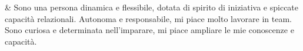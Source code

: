 & Sono una persona dinamica e f\mbox{}lessibile, dotata di spirito di iniziativa e spiccate capacit\`a relazionali. Autonoma e responsabile, mi piace molto lavorare in team. Sono curiosa e determinata nell'imparare, mi piace ampliare le mie conoscenze e capacit\`a.\\